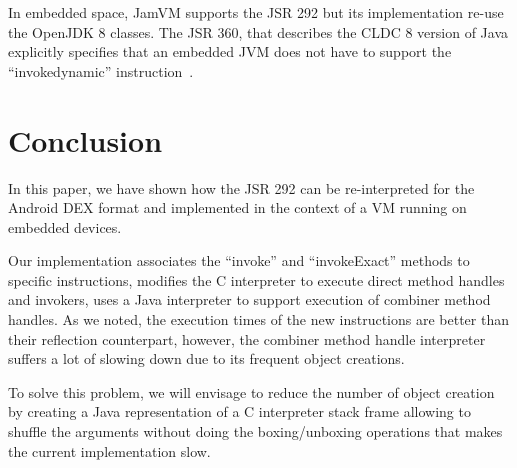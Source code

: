\documentclass{sig-alternate}
\def \Jsr{JSR\xspace}
\def \JSR{\Jsr 292\xspace}
\def \ANDROID{Android\xspace}
\begin{document}
  In embedded space, JamVM supports the \JSR but its implementation re-use the OpenJDK 8 classes.
  The \Jsr 360, that describes the CLDC 8 version of Java explicitly specifies that an embedded JVM does not have to support the  ``invokedynamic'' instruction~\cite{jcp-jsr-360}.
  
\section{Conclusion}
  In this paper, we have shown how the \JSR can be re-interpreted for the \ANDROID DEX format and
  implemented in the context of a VM running on embedded devices.

  Our implementation associates the ``invoke'' and ``invokeExact'' methods to specific instructions,
  modifies the C interpreter to execute direct method handles and invokers, uses a Java interpreter to support execution of combiner method handles.
  As we noted, the execution times of the new instructions are better than their reflection counterpart,
  however, the combiner method handle interpreter suffers a lot of slowing down due to its frequent object creations.

  To solve this problem, we will envisage to reduce the number of object creation by creating a Java representation of
  a C interpreter stack frame allowing to shuffle the arguments without doing the boxing/unboxing operations that
  makes the current implementation slow.

\appendix


\makeatletter
  \def\@seccntformat#1{Appendix~\csname the#1\endcsname:\quad}
\makeatother

% 

\end{document}
